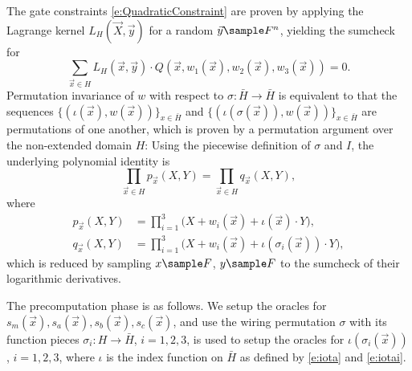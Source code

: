 \documentclass[11pt]{article}
\theoremstyle{definition}
\theoremstyle{remark}
\begin{document}
The gate constraints \eqref{e:QuadraticConstraint} are proven by applying the Lagrange kernel $L_H(\vec X,\vec y)$ for a random $\vec y\sample F^n$, yielding the sumcheck for
\[
\sum_{\vec x\in H} L_H(\vec x, \vec y) \cdot Q(\vec x, w_1(\vec x), w_2(\vec x), w_3(\vec x)) = 0.
\]
Permutation invariance of $w$ with respect to $\sigma: \bar H\longrightarrow \bar H$ is equivalent to that the sequences $\{(\iota(\vec x), w(\vec x))\}_{x\in \bar H}$ and $\{(\iota(\sigma(\vec x)), w(\vec x))\}_{x\in\bar H}$
 are permutations of one another, which is proven by a permutation argument over the non-extended domain $H$: 
Using the piecewise definition of $\sigma$ and $I$, the underlying polynomial identity is
\begin{equation}
\label{e:PermutationInvarianceIdentity}
\prod_{\vec x\in H} p_{\vec x}(X, Y)= \prod_{\vec x\in H}  q_{\vec x}(X, Y),
\end{equation}
where
\begin{align}
\label{e:FactorId}
p_{\vec x}(X, Y) &= \prod_{i=1}^3 \Big(X + w_i(\vec x) +  \iota(\vec x)\cdot Y\Big),
\\
\label{e:FactorSigma}
q_{\vec x}(X,  Y) &=  \prod_{i=1}^3\Big(X + w_i(\vec x) +\iota\left(\sigma_{i}(\vec x)\right)\cdot Y\Big), 
\end{align}
which is reduced by sampling $x\sample F$, $y\sample F$ to the sumcheck of their logarithmic derivatives. 

The precomputation phase is as follows.
We setup the oracles for  $s_m(\vec x), s_a(\vec x), s_b(\vec x), s_c(\vec x)$, and use the wiring permutation $\sigma$ with its function pieces $\sigma_i: H \longrightarrow \bar H$, $i=1,2,3$, is used to setup the oracles  for $\iota(\sigma_i(\vec x))$, $i=1,2,3$, where $\iota$ is the index function on $\bar H$ as defined by \eqref{e:iota} and \eqref{e:iotai}.
\end{document}
